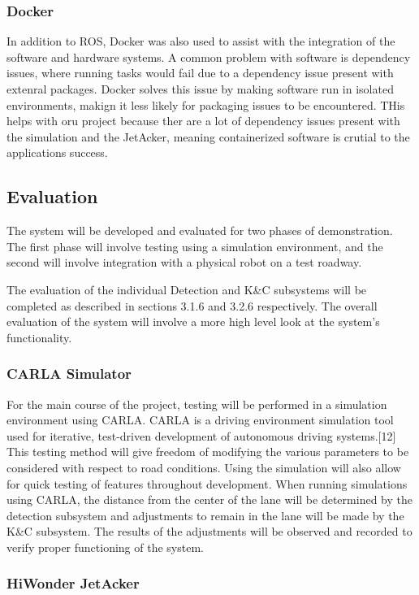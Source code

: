 \documentclass[titlepage]{article}
\begin{document}
\subsubsection{Docker}
In addition to ROS, Docker was also used to assist with the integration of the software and hardware systems. A common problem with software is dependency issues, where running tasks would fail due to a dependency issue present with extenral packages. Docker solves this issue by making software run in isolated environments, makign it less likely for packaging issues to be encountered. THis helps with oru project because ther are a lot of dependency issues present with the simulation and the JetAcker, meaning containerized software is crutial to the applications success.


\subsection{Evaluation}
The system will be developed and evaluated for two phases of demonstration. The first phase will involve testing using a simulation environment, and the second will involve integration with a physical robot on a test roadway. 

The evaluation of the individual Detection and K\&C subsystems will be completed as described in sections 3.1.6 and 3.2.6 respectively. The overall evaluation of the system will involve a more high level look at the system’s functionality. 

\subsubsection{CARLA Simulator}
For the main course of the project, testing will be performed in a simulation environment using CARLA. CARLA is a driving environment simulation tool used for iterative, test-driven development of autonomous driving systems.[12] This testing method will give freedom of modifying the various parameters to be considered with respect to road conditions. Using the simulation will also allow for quick testing of features throughout development. When running simulations using CARLA, the distance from the center of the lane will be determined by the detection subsystem and adjustments to remain in the lane will be made by the K\&C subsystem. The results of the adjustments will be observed and recorded to verify proper functioning of the system. 

\subsubsection{HiWonder JetAcker}
\end{document}
